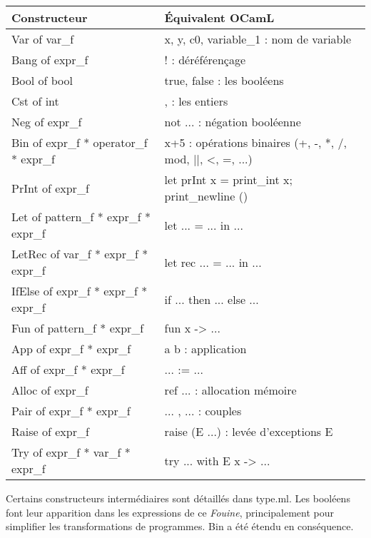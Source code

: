 \documentclass{article}
\newcommand\code[1]{{\fontfamily{lmtt}\selectfont #1}}
\begin{document}
	\begin{center}
	\begin{tabular}{l | l}
		Constructeur & Équivalent OCamL \\
		\hline
		\code{Var of var\_f} & \code{x, y, c0, variable\_1} : nom de variable \\
  		\code{Bang of expr\_f} & \code{!} : déréférençage\\
  		\code{Bool of bool} & \code{true}, \code{false} : les booléens\\
		\code{Cst of int} & \code{0}, \code{1} : les entiers\\
		\code{Neg of expr\_f} & \code{not ...} : négation booléenne \\
		\code{Bin of expr\_f * operator\_f * expr\_f} & \code{x+5} : opérations binaires (\code{+, -, *, /, mod, ||, <, =, ...}) \\
  		\code{PrInt of expr\_f} & \code{let prInt x = print\_int x; print\_newline ()} \\
		\code{Let of pattern\_f * expr\_f * expr\_f} & \code{let ... = ... in ... } \\
		\code{LetRec of var\_f * expr\_f * expr\_f} & \code{let rec ... = ... in ... }\\
		\code{IfElse of expr\_f * expr\_f * expr\_f} & \code{if ... then ... else ...} \\
		\code{Fun of pattern\_f * expr\_f} & \code{fun x -> ... } \\
		\code{App of expr\_f * expr\_f} & \code{ a b } : application \\
		\code{Aff of expr\_f * expr\_f} & \code{... := ...} \\
  		\code{Alloc of expr\_f} & \code{ref ...} : allocation mémoire \\
  		\code{Pair of expr\_f * expr\_f} & \code{... , ...} : couples \\
  		\code{Raise of expr\_f } & \code{raise (E ...) } : levée d'exceptions \code{E}\\
  		\code{Try of expr\_f * var\_f * expr\_f} & \code{try ... with E x -> ...} 
	\end{tabular}
	\end{center}
	
	\vspace{0.5cm}
	
	Certains constructeurs intermédiaires sont détaillés dans \code{type.ml}.
	Les booléens font leur apparition dans les expressions de ce \emph{Fouine}, principalement pour simplifier les transformations de programmes. \code{Bin} a été étendu en conséquence.
\end{document}

